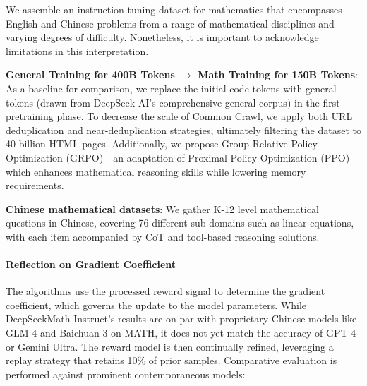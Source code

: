We assemble an instruction-tuning dataset for mathematics that encompasses English and Chinese problems from a range of mathematical disciplines and varying degrees of difficulty. Nonetheless, it is important to acknowledge limitations in this interpretation. \item \textbf{General Training for 400B Tokens $\rightarrow$ Math Training for 150B Tokens}: As a baseline for comparison, we replace the initial code tokens with general tokens (drawn from DeepSeek-AI’s comprehensive general corpus) in the first pretraining phase. To decrease the scale of Common Crawl, we apply both URL deduplication and near-deduplication strategies, ultimately filtering the dataset to 40 billion HTML pages. Additionally, we propose Group Relative Policy Optimization (GRPO)—an adaptation of Proximal Policy Optimization (PPO)—which enhances mathematical reasoning skills while lowering memory requirements. \item \textbf{Chinese mathematical datasets}: We gather K-12 level mathematical questions in Chinese, covering 76 different sub-domains such as linear equations, with each item accompanied by CoT and tool-based reasoning solutions. \paragraph{Reflection on Gradient Coefficient} The algorithms use the processed reward signal to determine the gradient coefficient, which governs the update to the model parameters. While DeepSeekMath-Instruct's results are on par with proprietary Chinese models like GLM-4 and Baichuan-3 on MATH, it does not yet match the accuracy of GPT-4 or Gemini Ultra. The reward model is then continually refined, leveraging a replay strategy that retains 10\% of prior samples. Comparative evaluation is performed against prominent contemporaneous models:

